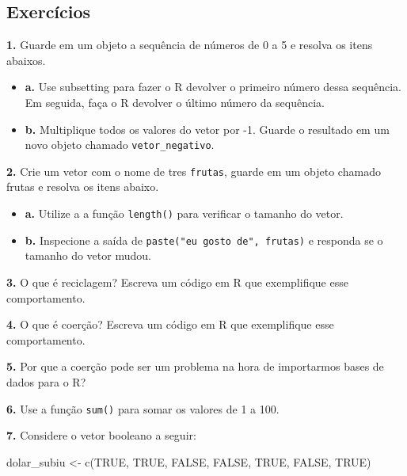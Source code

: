 \documentclass[
]{book}
\newenvironment{Shaded}{\begin{snugshade}}{\end{snugshade}}
\newcommand{\ConstantTok}[1]{\textcolor[rgb]{0.00,0.00,0.00}{#1}}
\newcommand{\FunctionTok}[1]{\textcolor[rgb]{0.00,0.00,0.00}{#1}}
\newcommand{\NormalTok}[1]{#1}
\newcommand{\OtherTok}[1]{\textcolor[rgb]{0.56,0.35,0.01}{#1}}
\begin{document}
\hypertarget{exercuxedcios-3}{%
\subsection*{Exercícios}\label{exercuxedcios-3}}

\textbf{1.} Guarde em um objeto a sequência de números de 0 a 5 e resolva os itens abaixos.

\begin{itemize}
\item
  \textbf{a.} Use subsetting para fazer o R devolver o primeiro número dessa sequência. Em seguida, faça o R devolver o último número da sequência.
\item
  \textbf{b.} Multiplique todos os valores do vetor por -1. Guarde o resultado em
  um novo objeto chamado \texttt{vetor\_negativo}.
\end{itemize}

\textbf{2.} Crie um vetor com o nome de tres \texttt{frutas}, guarde em um objeto chamado frutas e resolva os itens abaixo.

\begin{itemize}
\item
  \textbf{a.} Utilize a a função \texttt{length()} para verificar o tamanho do vetor.
\item
  \textbf{b.} Inspecione a saída de \texttt{paste("eu\ gosto\ de",\ frutas)} e responda se o tamanho do vetor mudou.
\end{itemize}

\textbf{3.} O que é reciclagem? Escreva um código em R que exemplifique esse comportamento.

\textbf{4.} O que é coerção? Escreva um código em R que exemplifique esse comportamento.

\textbf{5.} Por que a coerção pode ser um problema na hora de importarmos bases de dados para o R?

\textbf{6.} Use a função \texttt{sum()} para somar os valores de 1 a 100.

\textbf{7.} Considere o vetor booleano a seguir:

\begin{Shaded}
\begin{Highlighting}[]
\NormalTok{dolar\_subiu }\OtherTok{\textless{}{-}} \FunctionTok{c}\NormalTok{(}\ConstantTok{TRUE}\NormalTok{, }\ConstantTok{TRUE}\NormalTok{, }\ConstantTok{FALSE}\NormalTok{, }\ConstantTok{FALSE}\NormalTok{, }\ConstantTok{TRUE}\NormalTok{, }\ConstantTok{FALSE}\NormalTok{, }\ConstantTok{TRUE}\NormalTok{)}
\end{Highlighting}
\end{Shaded}
\end{document}
